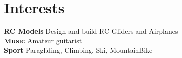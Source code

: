 \documentclass[a4paper]{friggeri-cv} %
\begin{document}
%
%
%
%
%
%





\section{Interests}
\textbf{RC Models} Design and build RC Gliders and Airplanes \\
\textbf{Music} Amateur guitarist \\
\textbf{Sport} Paragliding, Climbing, Ski, MountainBike \\
\end{document}
